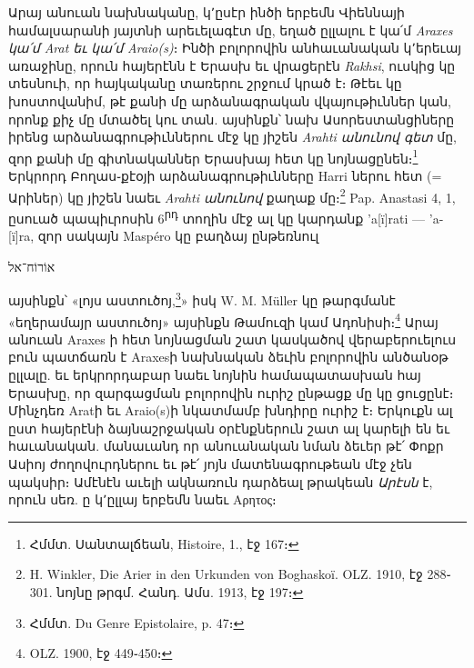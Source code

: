 \documentclass{article}
\begin{document}
{Արայ անուան նախնականը, կ՚ըսէր ինծի երբեմն Վիեննայի համալսարանի յայտնի արեւելագէտ մը, եղած ըլլալու է կա՛մ \emph{Araxes կա՛մ Arat եւ կա՛մ Araio(s)}։ Ինծի բոլորովին անհաւանական կ՚երեւայ առաջինը, որուն հայերէնն է Երասխ եւ վրացերէն \emph{Rakhsi}, ուսկից կը տեսնուի, որ հայկականը տառերու շրջում կրած է։ Թէեւ կը խոստովանիմ, թէ քանի մը արձանագրական վկայութիւններ կան, որոնք քիչ մը մտածել կու տան. այսինքն՝ նախ Ասորեստանցիները իրենց արձանագրութիւններու մէջ կը յիշեն \emph{Arahti անունով գետ} մը, զոր քանի մը գիտնականներ Երասխայ հետ կը նոյնացընեն։\footnote{Հմմտ. Սանտալճեան, Histoire, 1., էջ 167։} Երկրորդ Բողաս֊քէօյի արձանագրութիւնները Harri ներու հետ (= Արիներ) կը յիշեն նաեւ \emph{Arahti անունով} քաղաք մը։\footnote{H. Winkler, Die Arier in den Urkunden von Boghaskoï. OLZ. 1910, էջ 288֊301. նոյնը թրգմ. Հանդ. Ամս. 1913, էջ 197։} Pap. Anastasi 4, 1, ըսուած պապիւրոսին 6\textsuperscript{րդ} տողին մէջ ալ կը կարդանք 'a[ï]rati — 'a-[ï]ra, զոր սակայն Maspéro կը բաղձայ ընթեռնուլ \begin{hebrewfont}אוֹרוֹח־אל\end{hebrewfont} այսինքն՝ «լոյս աստուծոյ,\footnote{Հմմտ. Du Genre Epistolaire, p. 47։}» իսկ W. M. Müller կը թարգմանէ «եղերամայր աստուծոյ» այսինքն Թամուզի կամ Ադոնիսի։\footnote{OLZ. 1900, էջ 449֊450։} Արայ անուան Araxes ի հետ նոյնացման շատ կասկածով վերաբերուելուս բուն պատճառն է Araxesի նախնական ձեւին բոլորովին անծանօթ ըլլալը. եւ երկրորդաբար նաեւ նոյնին համապատասխան հայ Երասխը, որ զարգացման բոլորովին ուրիշ ընթացք մը կը ցուցընէ։ Մինչդեռ Aratի եւ Araio(s)ի նկատմամբ խնդիրը ուրիշ է։ Երկուքն ալ ըստ հայերէնի ձայնաշրջական օրէնքներուն շատ ալ կարելի են եւ հաւանական. մանաւանդ որ անուանական նման ձեւեր թէ՛ Փոքր Ասիոյ ժողովուրդներու եւ թէ՛ յոյն մատենագրութեան մէջ չեն պակսիր։ Ամէնէն աւելի ակնառուն դարձեալ թրակեան \emph{Արէսն} է, որուն սեռ. ը կ՚ըլլայ երբեմն նաեւ Αρητος։

}
\end{document}
